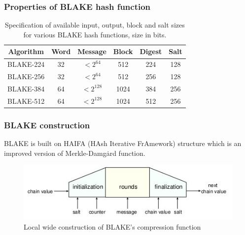 \documentclass{beamer}
\begin{document}
\begin{frame}
\frametitle{Properties of BLAKE hash function}
\begin{table}[h]
  \begin{center}
    \begin{tabular}{ *{6}{c} } \hline
      Algorithm & Word & Message    & Block & Digest & Salt \\ \hline
      BLAKE-224 & 32   & $< 2^{64}$  & 512   & 224    & 128  \\
      BLAKE-256 & 32   & $< 2^{64}$  & 512   & 256    & 128  \\
      BLAKE-384 & 64   & $< 2^{128}$ & 1024  & 384    & 256  \\
      BLAKE-512 & 64   & $< 2^{128}$ & 1024  & 512    & 256  \\ \hline
    \end{tabular}
    \caption{Specification of available input, output, block and salt sizes for various BLAKE hash functions,
    size in bits. \footnotemark}
  \end{center}
\end{table}
\end{frame}

\begin{frame}
\frametitle{BLAKE construction}
BLAKE is built on HAIFA (HAsh Iterative FrAmework) structure \footnotemark which is an improved version of 
Merkle-Damg\.{a}rd function.
\begin{figure}[h]
  \begin{center}
    \includegraphics[scale=0.5]{blakelocalwidepipeconstruction.jpg}
  \end{center}
  \caption{Local wide construction of BLAKE's compression function\footnotemark}
  \label{fig:seq}
\end{figure}
\end{frame}
\end{document}
